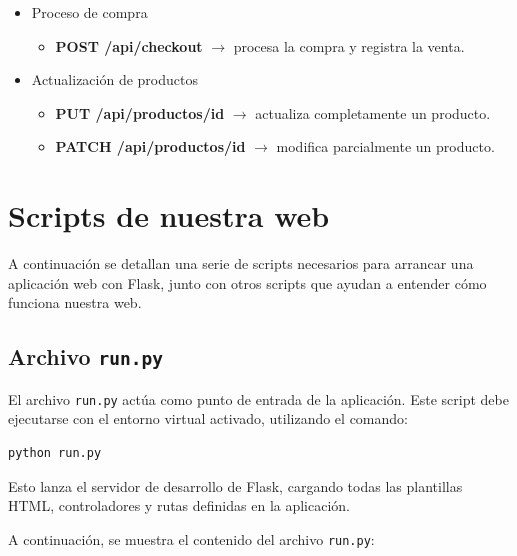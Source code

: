 \documentclass[10pt]{book}
\begin{document}
\begin{itemize}
\begin{itemize}
                \item \textbf{GET /api/pedidos/{id}} $\rightarrow$ devuelve los detalles de un pedido específico.
            \end{itemize}
            \item Proceso de compra
            \begin{itemize}
                \item \textbf{POST /api/checkout} $\rightarrow$ procesa la compra y registra la venta.
            \end{itemize}
            \item Actualización de productos
            \begin{itemize}
                \item \textbf{PUT /api/productos/{id}} $\rightarrow$ actualiza completamente un producto.
                \item \textbf{PATCH /api/productos/{id}} $\rightarrow$ modifica parcialmente un producto.
            \end{itemize}
        \end{itemize}
        
\section{Scripts de nuestra web}
A continuación se detallan una serie de scripts necesarios para arrancar una aplicación web con Flask, junto con otros scripts que ayudan a entender cómo funciona nuestra web.
\subsection{Archivo \texttt{run.py}}

    El archivo \texttt{run.py} actúa como punto de entrada de la aplicación. Este script debe ejecutarse con el entorno virtual activado, utilizando el comando:
    
    \begin{lstlisting}[style=simplebash]
    python run.py
    \end{lstlisting}
    
    Esto lanza el servidor de desarrollo de Flask, cargando todas las plantillas HTML, controladores y rutas definidas en la aplicación.
    
    A continuación, se muestra el contenido del archivo \texttt{run.py}:
    
\end{document}
